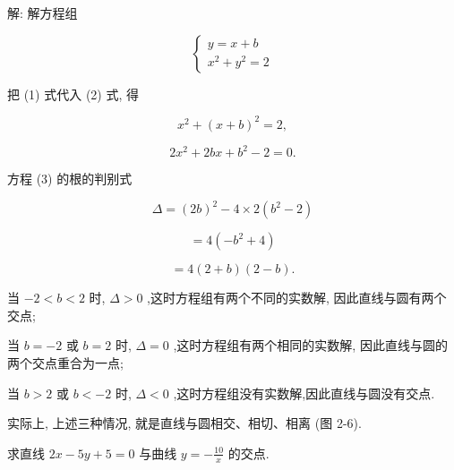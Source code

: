 \documentclass[lang=cn,newtx,10pt,scheme=chinese]{elegantbook}
\begin{document}
解: 解方程组

\[
  \left\{ \begin{array}{l} y = x + b \\ {x}^{2} + {y}^{2} = 2 \end{array}\right. \tag{1 2}
\]

把 (1) 式代入 (2) 式, 得

\[
    {x}^{2} + {\left( x + b\right) }^{2} = 2,
\]

\[
  2{x}^{2} + {2bx} + {b}^{2} - 2 = 0. \tag{3}
\]

方程 (3) 的根的判别式

\[
  \Delta = {\left( 2b\right) }^{2} - 4 \times 2\left( {{b}^{2} - 2}\right)
\]

\[
  = 4\left( {-{b}^{2} + 4}\right)
\]

\[
  = 4\left( {2 + b}\right) \left( {2 - b}\right) \text{.}
\]

当 \(- 2 < b < 2\) 时, \(\Delta > 0\) ,这时方程组有两个不同的实数解, 因此直线与圆有两个交点;

当 \(b = - 2\) 或 \(b = 2\) 时, \(\Delta = 0\) ,这时方程组有两个相同的实数解, 因此直线与圆的两个交点重合为一点;

当 \(b > 2\) 或 \(b < - 2\) 时, \(\Delta < 0\) ,这时方程组没有实数解,因此直线与圆没有交点.

实际上, 上述三种情况, 就是直线与圆相交、相切、相离 (图 2-6).

\begin{problemset}[练习]

\item 求直线 \({2x} - {5y} + 5 = 0\) 与曲线 \(y = - \frac{10}{x}\) 的交点.
\end{problemset}
\end{document}
